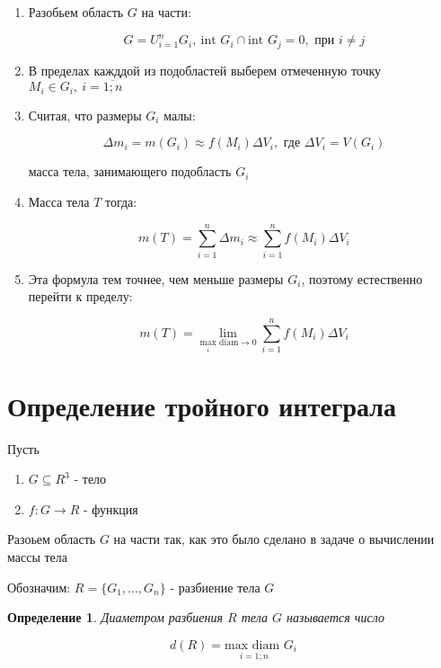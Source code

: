 \documentclass[a4paper, 14pt]{report}
\newtheorem{defenition}{Определение}[chapter]
\begin{document}
    \begin{enumerate}
        \item Разобьем область $G$ на части:

            $$
            G = U_{i=1}^{n} G_i,\ \text{int }G_i \cap \text{int } G_j = 0, \text{ при } i \ne j
            $$

        \item В пределах кажддой из подобластей выберем отмеченную точку $M_i \in G_i,\ i = \overline{1;n}$

        \item Считая, что размеры $G_i$ малы:

            $$
            \Delta m_i = m(G_i) \approx f(M_i) \Delta V_i, \text{ где } \Delta V_i = V(G_i)
            $$

            масса тела, занимающего подобласть $G_i$

        \item Масса тела $T$ тогда:

            $$
            m(T) = \sum_{i=1}^n \Delta m_i \approx \sum_{i=1}^n f(M_i) \Delta V_i
            $$

        \item Эта формула тем точнее, чем меньше размеры $G_i$, поэтому естественно перейти к пределу:

            $$
            m(T) = \underset{ \underset{i}{\text{max}}\text{ diam} \to 0 }{\lim} \sum_{i=1}^n f(M_i) \Delta V_i
            $$
    \end{enumerate}

    \section{Определение тройного интеграла}

    Пусть 

    \begin{enumerate}
        \item $G \subseteq R^3$ - тело
        \item $f:G \to R$ - функция
    \end{enumerate}

    Разоьем область $G$ на части так, как это было сделано в задаче о вычислении массы тела

    Обозначим: $R = \{G_1,...,G_n\}$ - разбиение тела $G$

    \begin{defenition}
        Диаметром разбиения $R$ тела $G$ называется число

        $$
        d(R) = \underset{i = \overline{1;n}}{\text{max diam }} G_i
        $$
    \end{defenition}
\end{document}
